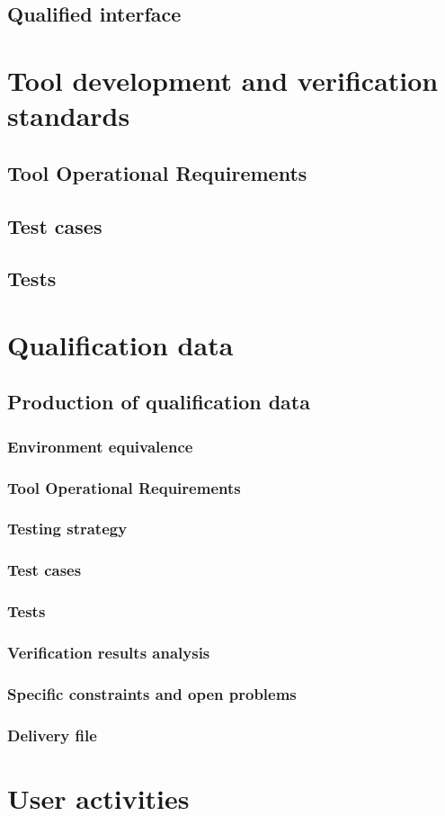 \documentclass {report}
\begin{document}
\section{Qualified interface}

\chapter{Tool development and verification standards}
\section{Tool Operational Requirements}
\section{Test cases}
\section{Tests}

\chapter{Qualification data}
\section{Production of qualification data}
\subsection{Environment equivalence}
\subsection{Tool Operational Requirements}
\subsection{Testing strategy}
\subsection{Test cases}
\subsection{Tests}
\subsection{Verification results analysis}
\subsection{Specific constraints and open problems}
\subsection{Delivery file}

\chapter{User activities}
\end{document}
